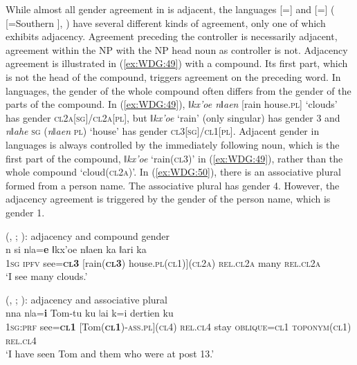 \documentclass[output=collectionpaper]{langsci/langscibook}
\begin{document}
While almost all gender agreement in  is adjacent, the  languages  [=] and  [=] ( [=Southern ], ) have several different kinds of agreement, only one of which exhibits adjacency. Agreement preceding the controller is necessarily adjacent, agreement within the NP with the NP head noun as controller is not. Adjacency agreement is illustrated in (\ref{ex:WDG:49}) with a compound. Its first part, which is not the head of the compound, triggers agreement on the preceding word. In  languages, the gender of the whole compound often differs from the gender of the parts of the compound. In (\ref{ex:WDG:49}), \textit{ǁkx'oe nǁaen} [rain house.\textsc{pl}] `clouds' has gender \textsc{cl2a[sg]/cl2a[pl]}, but \textit{ǁkx'oe} `rain' (only singular) has gender 3 and \textit{nǁahe} \textsc{sg} (\textit{nǁaen} \textsc{pl}) `house' has gender \textsc{cl3[sg]/cl1[pl]}. Adjacent gender in  languages is always controlled by the immediately following noun, which is the first part of the compound, \textit{ǁkx'oe} `rain(\textsc{cl3})' in (\ref{ex:WDG:49}), rather than the whole compound `cloud(\textsc{cl2a})'. In (\ref{ex:WDG:50}), there is an associative plural formed from a person name. The associative plural has gender 4. However, the adjacency agreement is triggered by the gender of the person name, which is gender 1.

\ea\label{ex:WDG:49}
 (, ; \citealt{Gueldemann2004}): adjacency and compound gender\\
\gll n 	si 	nǀa=\textbf{e} 	ǁkx'oe	nǁaen 	ka 	ǁari 	ka\\
\textsc{1sg} 	\textsc{ipfv} 	see=\textbf{\textsc{cl3}} 	[rain(\textbf{\textsc{cl3}}) 	house.\textsc{pl(cl1)](cl2a)} 	\textsc{rel.cl2a}	many 	\textsc{rel.cl2a}\\
\glt `I see many clouds.'\\
\z

\ea\label{ex:WDG:50}
 (, ; \citealt{Gueldemann2006}): adjacency and associative plural\\
\gll nna	nǀa=\textbf{i}	Tom-tu	ku	ǀai	k=i	dertien	ku\\
\textsc{1sg:prf}	see=\textbf{\textsc{cl1}}	[Tom(\textbf{\textsc{cl1}})-\textsc{ass.pl](cl4)}	\textsc{rel.cl4}	stay	\textsc{oblique=cl1}	\textsc{toponym(cl1)}	\textsc{rel.cl4}\\
\glt `I have seen Tom and them who were at post 13.'\\
\z
\end{document}
